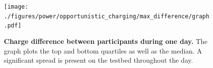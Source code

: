\begin{figure}[th!]
\centering
\texttt{[image: ./figures/power/opportunistic\_charging/max\_difference/graph.pdf]}
\caption{\textbf{Charge difference between participants during one day.} The
graph plots the top and bottom quartiles as well as the median. A significant
spread is present on the testbed throughout the day.}
\label{fig-opportunisticspread}
\end{figure}
%
%
%
%
